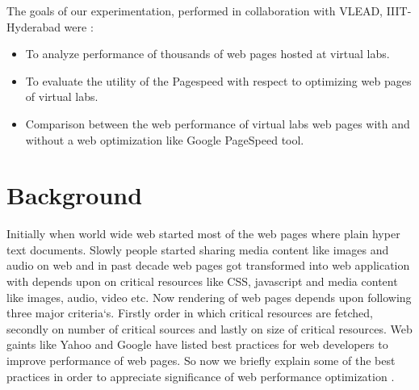 \documentclass[conference]{IEEEtran}
\begin{document}
The goals of our experimentation, performed in collaboration with VLEAD,
IIIT-Hyderabad were :

\begin{itemize}
\item To analyze performance of thousands of web pages hosted at virtual labs.
\item To evaluate the utility of the Pagespeed with respect to optimizing web pages of virtual labs.
\item Comparison between the web performance of virtual labs web pages with
and without a web optimization like Google PageSpeed tool.
\end{itemize}

\section{Background}\label{sec-3}
Initially when world wide web started most of the web pages where plain hyper text documents.
Slowly people started sharing media content like images and audio on web and in past decade
web pages got transformed into web application with depends upon on critical resources
like CSS, javascript and media content like images, audio, video etc. Now rendering of web pages depends upon
following three major criteria`s. Firstly order in which critical resources are fetched, secondly on
number of critical sources and lastly on size of critical resources. Web gaints like Yahoo and Google
have listed best practices for web developers to improve performance of web pages. So now we briefly
explain some of the best practices in order to appreciate significance of web performance optimization \cite{best-practices}.
\end{document}
